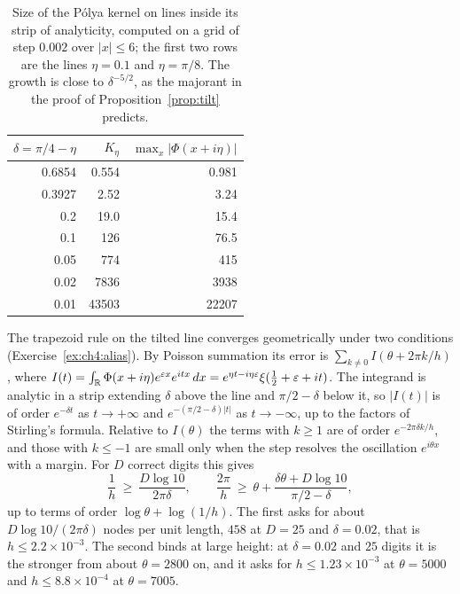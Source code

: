 \begin{table}[htbp]
\centering\small
\begin{tabular}{rrr}
\toprule
$\delta=\pi/4-\eta$ & $K_\eta$ & $\max_x|\Phi(x+i\eta)|$\\
\midrule
0.6854 & 0.554 & 0.981\\
0.3927 & 2.52 & 3.24\\
0.2 & 19.0 & 15.4\\
0.1 & 126 & 76.5\\
0.05 & 774 & 415\\
0.02 & 7836 & 3938\\
0.01 & 43503 & 22207\\
\bottomrule
\end{tabular}
\caption{Size of the P\'olya kernel on lines inside its strip of analyticity, computed on a grid of step $0.002$ over $|x|\le6$; the first two rows are the lines $\eta=0.1$ and $\eta=\pi/8$. The growth is close to $\delta^{-5/2}$, as the majorant in the proof of Proposition~\ref{prop:tilt} predicts.}
\label{tab:ch4:Meta}
\end{table}

The trapezoid rule on the tilted line converges geometrically under two conditions (Exercise~\ref{ex:ch4:alias}). By Poisson summation its error is $\sum_{k\ne0}I(\theta+2\pi k/h)$, where $I(t)=\int_{\mathbb{R}}\Phi(x+i\eta)e^{\varepsilon x}e^{itx}\,dx=e^{\eta t-i\eta\varepsilon}\xi(\tfrac12+\varepsilon+it)$. The integrand is analytic in a strip extending $\delta$ above the line and $\pi/2-\delta$ below it, so $|I(t)|$ is of order $e^{-\delta t}$ as $t\to+\infty$ and $e^{-(\pi/2-\delta)|t|}$ as $t\to-\infty$, up to the factors of Stirling's formula. Relative to $I(\theta)$ the terms with $k\ge1$ are of order $e^{-2\pi\delta k/h}$, and those with $k\le-1$ are small only when the step resolves the oscillation $e^{i\theta x}$ with a margin. For $D$ correct digits this gives
\begin{equation}\label{eq:ch4:tiltcond}
\frac1h\ \ge\ \frac{D\log10}{2\pi\delta},\qquad \frac{2\pi}h\ \ge\ \theta+\frac{\delta\theta+D\log10}{\pi/2-\delta},
\end{equation}
up to terms of order $\log\theta+\log(1/h)$. The first asks for about $D\log10/(2\pi\delta)$ nodes per unit length, $458$ at $D=25$ and $\delta=0.02$, that is $h\le2.2\times10^{-3}$. The second binds at large height: at $\delta=0.02$ and $25$ digits it is the stronger from about $\theta=2800$ on, and it asks for $h\le1.23\times10^{-3}$ at $\theta=5000$ and $h\le8.8\times10^{-4}$ at $\theta=7005$.

